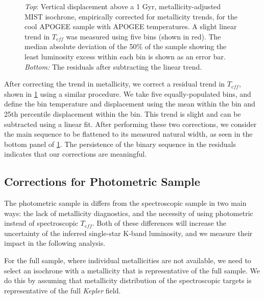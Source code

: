 \documentclass[manuscript]{aastex6}
\newcommand{\Kepler}{\mbox{\textit{Kepler}}}
\newcommand{\Teff}{\ensuremath{T_{eff}}}
\begin{document}
\begin{figure}[htb]
    \centering
    \caption{\emph{Top}: Vertical displacement above a 1 Gyr,
        metallicity-adjusted MIST isochrone, empirically corrected for
        metallicity trends, for the cool APOGEE sample with APOGEE temperatures. 
        A slight linear trend in \Teff{} was measured using five bins (shown in
        red). The median absolute deviation of the 50\% of the sample showing 
        the least luminosity excess within each bin is shown as an error bar. 
        \emph{Bottom:} The residuals after subtracting the linear 
    trend.}\label{fig:apogee_teff_trend}
\end{figure}

After correcting the trend in metallicity, we correct a residual trend in
\Teff{}, shown in \cref{fig:apogee_teff_trend} using a similar procedure. We
take five equally-populated bins, and define the bin temperature and 
displacement using the mean within the bin  and 25th percentile displacement
within the bin.  This trend is slight and can be subtracted using a linear 
fit. After performing these two corrections, we consider the main sequence to be 
flattened to its measured natural width, as seen in the bottom panel of 
\cref{fig:apogee_teff_trend}. The persistence of the binary sequence in the 
residuals indicates that our corrections are meaningful.  

\subsection{Corrections for Photometric Sample}

The photometric sample in \citet{McQuillan14} differs from the spectroscopic
sample in two main ways: the lack of metallicity diagnostics, and the necessity
of using photometric instead of spectroscopic \Teff{}. Both of these
differences will increase the uncertainty of the inferred single-star K-band
luminosity, and we measure their impact in the following analysis.

For the full \citet{McQuillan14} sample, where individual metallicities are not
available, we need to select an isochrone with a metallicity that is 
representative of the full sample. We do this by assuming that metallicity 
distribution of the spectroscopic targets is representative of the full 
\Kepler{} field. 
\end{document}
